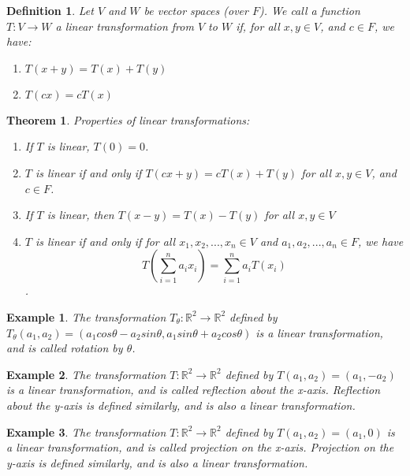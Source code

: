 \documentclass[a4paper]{article}
\newtheorem{mytheorem}{Theorem}
\newtheorem{example}{Example}
\newtheorem{mydef}{Definition}
\numberwithin{mytheorem}{section}
\numberwithin{mydef}{section}
\numberwithin{example}{section}
\begin{document}
\begin{mydef} Let $V$ and $W$ be vector spaces (over $F$). We call a function $T: V \rightarrow W$ a linear transformation from $V$ to $W$ if, for all $x,y \in V$, and $c \in F$, we have:
\begin{enumerate}
\item $T(x+y) = T(x) + T(y)$
\item $T(cx) = cT(x)$
\end{enumerate}
\end{mydef}

\begin{mytheorem} Properties of linear transformations:
\begin{enumerate}
\item If $T$ is linear, $T(0) = 0$.
\item $T$ is linear if and only if $T(cx+y) = cT(x) + T(y)$ for all $x,y \in V$, and $c \in F$.
\item If $T$ is linear, then $T(x-y) = T(x)-T(y)$ for all $x,y \in V$
\item $T$ is linear if and only if for all $x_{1},x_{2},...,x_{n} \in V$ and $a_{1},a_{2},...,a_{n} \in F$, we have $$T(\sum^{n}_{i=1}a_{i}x_{i}) = \sum^{n}_{i=1}a_{i}T(x_{i})$$.
\end{enumerate}
\end{mytheorem}

\begin{example} The transformation $T_{\theta}: \mathbb{R}^{2} \rightarrow \mathbb{R}^{2}$ defined by $T_{\theta}(a_{1},a_{2}) = (a_{1}cos \theta - a_{2} sin \theta, a_{1} sin \theta + a_{2} cos \theta)$ is a linear transformation, and is called rotation by $\theta$. 
\end{example}

\begin{example} The transformation $T: \mathbb{R}^{2} \rightarrow \mathbb{R}^{2}$ defined by $T(a_{1},a_{2}) = (a_{1},-a_{2})$ is a linear transformation, and is called reflection about the x-axis. Reflection about the y-axis is defined similarly, and is also a linear transformation.
\end{example}

\begin{example} The transformation $T: \mathbb{R}^{2} \rightarrow \mathbb{R}^{2}$ defined by $T(a_{1},a_{2}) = (a_{1},0)$ is a linear transformation, and is called projection on the x-axis. Projection on the y-axis is defined similarly, and is also a linear transformation.
\end{example}
\end{document}
